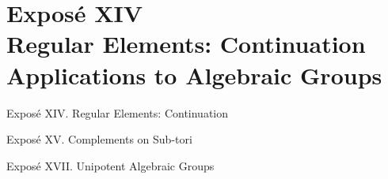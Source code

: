 \documentclass[11pt,a4paper,oneside]{book}
\begin{document}
\clearpage
{}
\makeatletter
\tagsleft@true
\let\veqno\@@leqno
\makeatother
{}




\makeatletter
\tagsleft@false
\let\veqno\@@eqno
\makeatother
\restoregeometry

\clearpage
\graphicspath{{xiv/}{figures/}{figures/exp7/}{assets/diagrams/}}
\begingroup
\chapter*{Expos\'e XIV\\Regular Elements: Continuation\\
Applications to Algebraic Groups}
  {Expos\'e XIV. Regular Elements: Continuation}
\setcounter{section}{0}
\renewcommand{\thesection}{\arabic{section}}

\endgroup

\clearpage
{}
  {Expos\'e XV. Complements on Sub-tori}











\clearpage
\graphicspath{{xvi/}{figures/}{figures/exp7/}{assets/diagrams/}}







\clearpage
{}
  {Expos\'e XVII. Unipotent Algebraic Groups}

\end{document}
